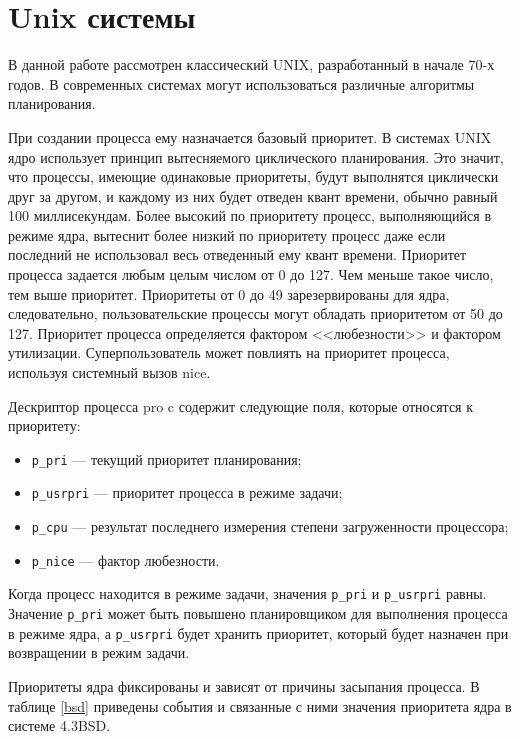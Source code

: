 \section{Unix системы}
В данной работе рассмотрен классический UNIX, разработанный в начале 70-х годов. В современных системах могут использоваться различные алгоритмы планирования. 

При создании процесса ему назначается базовый приоритет. В системах UNIX ядро использует принцип вытесняемого циклического планирования. Это значит, что процессы, имеющие одинаковые приоритеты, будут выполнятся циклически друг за другом, и каждому из них будет отведен квант времени, обычно равный 100 миллисекундам. Более высокий по приоритету процесс, выполняющийся в режиме ядра, вытеснит более низкий по приоритету процесс  даже если последний не использовал весь отведенный ему квант времени. Приоритет процесса задается любым целым числом от 0 до 127. Чем меньше такое число, тем выше приоритет. Приоритеты от 0 до 49 зарезервированы для ядра, следовательно, пользовательские процессы могут обладать приоритетом от 50 до 127. Приоритет процесса определяется фактором <<любезности>> и фактором утилизации. Суперпользователь может повлиять на приоритет процесса, используя системный вызов nice. %

Дескриптор процесса pro c содержит следующие поля, которые относятся к приоритету:
\begin{itemize}
	\item \texttt{p\_pri} --- текущий приоритет планирования;
	\item \texttt{p\_usrpri} --- приоритет процесса в режиме задачи;
	\item \texttt{p\_cpu} --- результат последнего измерения степени загруженности процессора;
	\item \texttt{p\_nice} --- фактор любезности.
\end{itemize}
Когда процесс находится в режиме задачи, значения \texttt{p\_pri} и \texttt{p\_usrpri} равны. Значение \texttt{p\_pri} может быть повышено планировщиком для выполнения процесса в режиме ядра, а \texttt{p\_usrpri} будет хранить приоритет, который будет назначен при возвращении в режим задачи. 

Приоритеты ядра фиксированы и зависят от причины засыпания процесса. В таблице \ref{bsd} приведены события и связанные с ними значения приоритета ядра в системе 4.3BSD. 

